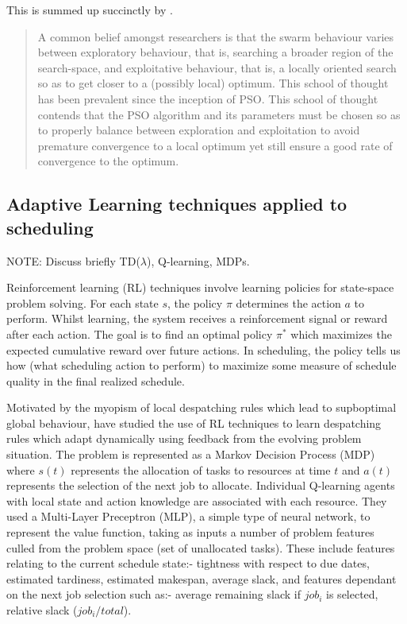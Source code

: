 This is summed up succinctly by \citet{kennedy97particle}.
\begin{quote}
A common belief amongst researchers is that the swarm behaviour varies between exploratory behaviour, that is, searching a broader region of the search-space, and exploitative behaviour, that is, a locally oriented search so as to get closer to a (possibly local) optimum. This school of thought has been prevalent since the inception of PSO. This school of thought contends that the PSO algorithm and its parameters must be chosen so as to properly balance between exploration and exploitation to avoid premature convergence to a local optimum yet still ensure a good rate of convergence to the optimum. 
\end{quote}



%
%
\subsection{Adaptive Learning techniques applied to scheduling}
\label{sub:review_adaptive}

NOTE: Discuss briefly TD($\lambda$), Q-learning, MDPs.

Reinforcement learning (RL) techniques involve learning policies for state-space problem solving. For each state $s$, the policy $\pi$ determines the action $a$ to perform. Whilst learning, the system receives a reinforcement signal or reward after each action. The goal is to find an optimal policy $\pi^*$ which maximizes the expected cumulative reward over future actions. In scheduling, the policy tells us how (what scheduling action to perform) to maximize some measure of schedule quality in the final realized schedule.

Motivated by the myopism of local despatching rules which lead to supboptimal global behaviour, \citet{riedmiller99neural} have studied the use of RL techniques to learn despatching rules which adapt dynamically using feedback from the evolving problem situation. The problem is represented as a Markov Decision Process (MDP) where $s(t)$ represents the allocation of tasks to resources at time $t$ and $a(t)$ represents the selection of the next job to allocate. Individual Q-learning agents with local state and action knowledge are associated with each resource. They used a Multi-Layer Preceptron (MLP), a simple type of neural network, to represent the value function, taking as inputs a number of problem features culled from the problem space (set of unallocated tasks). These include features relating to the current schedule state:- tightness with respect to due dates, estimated tardiness, estimated makespan, average slack, and features dependant on the next job selection such as:- average remaining slack if $job_i$ is selected, relative slack ($job_i/total$).

